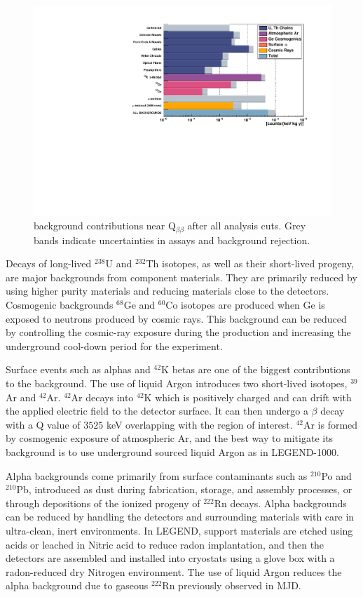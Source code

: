 \begin{figure}
\centering
  \includegraphics[width=0.99\linewidth]{ch2/figs/L200_background.pdf}
  \caption{{\Ltwo} background contributions near Q$_{\beta\beta}$ after all analysis cuts. Grey bands indicate uncertainties in assays and background rejection.}
\label{fig:L200_background}
  \end{figure}
  
Decays of long-lived $^{238}$U and $^{232}$Th isotopes, as well as their short-lived progeny, are major backgrounds from component materials. They are primarily reduced by using higher purity materials and reducing materials close to the detectors. Cosmogenic backgrounds $^{68}$Ge and $^{60}$Co isotopes are produced when Ge is exposed to neutrons produced by cosmic rays. This background can be reduced by controlling the cosmic-ray exposure during the production and increasing the underground cool-down period for the experiment. 

Surface events such as alphas and $^{42}$K betas are one of the biggest contributions to the background. The use of liquid Argon introduces two short-lived isotopes, $^{39}$Ar and $^{42}$Ar.  $^{42}$Ar decays into $^{42}$K which is positively charged and can drift with the applied electric field to the detector surface. It can then undergo a $\beta$ decay with a Q value of $3525$ keV overlapping with the region of interest. $^{42}$Ar is formed by cosmogenic exposure of atmospheric Ar, and the best way to mitigate its background is to use underground sourced liquid Argon as in LEGEND-1000.

Alpha backgrounds come primarily from surface contaminants such as $^{210}$Po and $^{210}$Pb, introduced as dust during fabrication, storage, and assembly processes, or through depositions of the ionized progeny of $^{222}$Rn decays. Alpha backgrounds can be reduced by handling the detectors and surrounding materials with care in ultra-clean, inert environments. In LEGEND, support materials are etched using acids or leached in Nitric acid to reduce radon implantation, and then the detectors are assembled and installed into cryostats using a glove box with a radon-reduced dry Nitrogen environment. The use of liquid Argon reduces the alpha background due to gaseous $^{222}$Rn previously observed in MJD.

